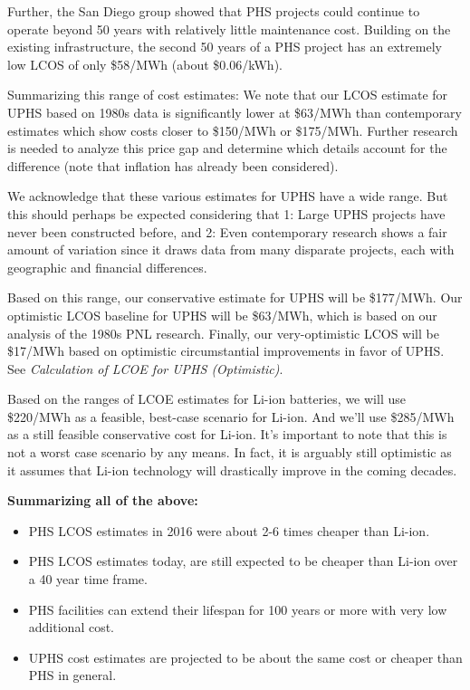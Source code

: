 Further, the San Diego group showed that PHS projects could continue to operate beyond 50 years with relatively little maintenance cost. Building on the existing infrastructure, the second 50 years of a PHS project has an extremely low LCOS of only \$58/MWh  (about \$0.06/kWh).


Summarizing this range of cost estimates:
We note that our LCOS estimate for UPHS based on 1980s data is significantly lower at \$63/MWh than contemporary estimates which show costs closer to \$150/MWh or \$175/MWh. Further research is needed to analyze this price gap and determine which details account for the difference (note that inflation has already been considered).

We acknowledge that these various estimates for UPHS have a wide range. But this should perhaps be expected considering that 1: Large UPHS projects have never been constructed before, and 2: Even contemporary research shows a fair amount of variation since it draws data from many disparate projects, each with geographic and financial differences.

Based on this range, our conservative estimate for UPHS will be \$177/MWh. Our optimistic LCOS baseline for UPHS will be \$63/MWh, which is based on our analysis of the 1980s PNL research. Finally, our very-optimistic LCOS will be \$17/MWh based on optimistic circumstantial improvements in favor of UPHS. See \textit{Calculation of LCOE for UPHS (Optimistic)}.


Based on the ranges of LCOE estimates for Li-ion batteries, we will use \$220/MWh as a feasible, best-case scenario for Li-ion. And we'll use \$285/MWh as a still feasible conservative cost for Li-ion. It's important to note that this is not a worst case scenario by any means. In fact, it is arguably still optimistic as it assumes that Li-ion technology will drastically improve in the coming decades.

\noindent\textbf{Summarizing all of the above:}
\begin{itemize}
  \item PHS LCOS estimates in 2016 were about 2-6 times cheaper than Li-ion.
  \item PHS LCOS estimates today, are still expected to be cheaper than Li-ion over a 40 year time frame.
  \item PHS facilities can extend their lifespan for 100 years or more with very low additional cost.
  \item UPHS cost estimates are projected to be about the same cost or cheaper than PHS in general.
\end{itemize}

